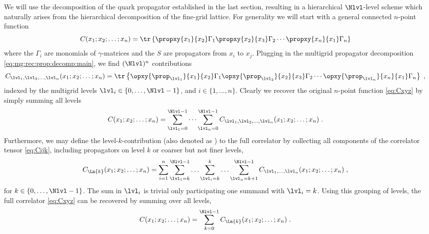 We will use the decomposition of the quark propagator established in the last section, resulting in a hierarchical $\Nlvl$-level scheme which naturally arises from the hierarchical decomposition of the fine-grid lattice.
For generality we will start with a general connected $n$-point function
\begin{equation} \label{eq:Cxyz}
C(x_1;x_2;\ldots;x_n) = \tr \left\{
\propxy{x_1}{x_2}
\Gamma_1
\propxy{x_2}{x_3}
\Gamma_2
\cdots
\propxy{x_n}{x_1}
\Gamma_n
\right\}
\end{equation}
where the $\Gamma_i$ are monomials of $\gamma$-matrices and the $S$ are propagators from $x_i$ to $x_j$.
Plugging in the multigrid propagator decomposition \cref{eq:mg:rec:prop:decomp:main}, we find $(\Nlvl)^{n}$ contributions
\begin{equation} \label{eq:Cijk}
C_{\lvl_1, \lvl_2, \ldots, \lvl_n}(x_1;x_2;\ldots;x_n)
= \tr \left\{
\opxy{\prop_{\lvl_1}}{x_1}{x_2}
\Gamma_1
\opxy{\prop_{\lvl_2}}{x_2}{x_3}
\Gamma_2
\cdots
\opxy{\prop_{\lvl_n}}{x_n}{x_1}
\Gamma_n
\right\} \;,
\end{equation}
indexed by the multigrid levels $\lvl_i \in \{0, \ldots, \Nlvl-1\}$, and $i \in \{1, \ldots, n\}$.
Clearly we recover the original $n$-point function \cref{eq:Cxyz} by simply summing all levels
\begin{equation}
C(x_1;x_2;\ldots;x_n)
= \sum_{\lvl_1=0}^{\Nlvl-1} \cdots \sum_{\lvl_n=0}^{\Nlvl-1}
C_{\lvl_1, \lvl_2, \ldots, \lvl_n}(x_1;x_2;\ldots;x_n) \;.
\end{equation}
Furthermore, we may define the level-$k$-contribution (also denoted as ) to the full correlator by collecting all components of the correlator tensor \cref{eq:Cijk}, including propagators on level $k$ or coarser but not finer levels, \ie
\begin{align}
C_{\Ln{k}}(x_1;x_2;\ldots;x_n)
= \sum_{i=1}^{n}
  \sum_{\lvl_1=k}^{\Nlvl-1}
  \ldots
  \sum_{\lvl_i=k}^{k}
  \ldots
  \sum_{\lvl_n=k+1}^{\Nlvl-1}
  C_{\lvl_1, \ldots, \lvl_n}(x_1;x_2;\ldots;x_n) \;,
\end{align}
for $k \in \{0, \ldots, \Nlvl-1\}$.
The sum in $\lvl_i$ is trivial only participating one summand with $\lvl_i=k$.
Using this grouping of levels, the full correlator \cref{eq:Cxyz} can be recovered by summing over all levels,
\begin{align}
C(x_1;x_2;\ldots;x_n) = \sum_{k=0}^{\Nlvl-1} C_{\Ln{k}}(x_1;x_2;\ldots;x_n) \;.
\end{align}
